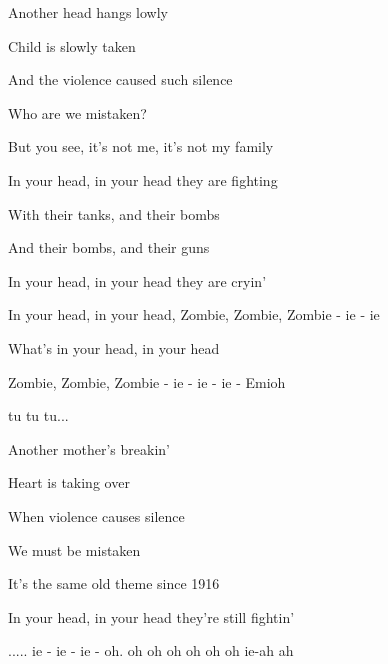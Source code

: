 


       
\zs
Another head hangs lowly

Child is slowly taken
 
And the violence caused such silence
 
Who are we mistaken?
 
But you see, it's not me, it's not my family

In your head, in your head they are fighting
\ks

\zr 
With their tanks, and their bombs

And their bombs, and their guns

In your head, in your head they are cryin'
 
In your head, in your head, Zombie, Zombie, Zombie - ie - ie

What's in your head, in your head

Zombie, Zombie, Zombie - ie - ie - ie - Emioh

            

tu tu tu...
\kr

\zs
Another mother's breakin' 

Heart is taking over

When violence causes silence 

We must be mistaken

It's the same old theme since 1916

In your head, in your head they're still fightin'
\ks

\zr
..... ie - ie - ie - oh. oh oh oh oh oh oh  ie-ah ah   
\kr 

\kp
